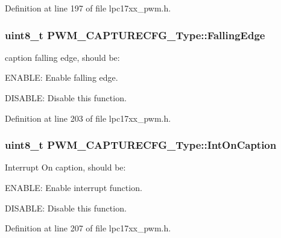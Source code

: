 \-Definition at line 197 of file lpc17xx\-\_\-pwm.\-h.

\hypertarget{struct_p_w_m___c_a_p_t_u_r_e_c_f_g___type_a071675984cbb68eae6d11323188eec27}{
\subsubsection[{\-Falling\-Edge}]{\setlength{\rightskip}{0pt plus 5cm}uint8\-\_\-t {\bf \-P\-W\-M\-\_\-\-C\-A\-P\-T\-U\-R\-E\-C\-F\-G\-\_\-\-Type\-::\-Falling\-Edge}}}\label{struct_p_w_m___c_a_p_t_u_r_e_c_f_g___type_a071675984cbb68eae6d11323188eec27}
caption falling edge, should be\-:
\begin{DoxyItemize}
\item \-E\-N\-A\-B\-L\-E\-: \-Enable falling edge.
\item \-D\-I\-S\-A\-B\-L\-E\-: \-Disable this function. 
\end{DoxyItemize}

\-Definition at line 203 of file lpc17xx\-\_\-pwm.\-h.

\hypertarget{struct_p_w_m___c_a_p_t_u_r_e_c_f_g___type_ab89855a6f6f1a335ab30894982032b08}{
\subsubsection[{\-Int\-On\-Caption}]{\setlength{\rightskip}{0pt plus 5cm}uint8\-\_\-t {\bf \-P\-W\-M\-\_\-\-C\-A\-P\-T\-U\-R\-E\-C\-F\-G\-\_\-\-Type\-::\-Int\-On\-Caption}}}\label{struct_p_w_m___c_a_p_t_u_r_e_c_f_g___type_ab89855a6f6f1a335ab30894982032b08}
\-Interrupt \-On caption, should be\-:
\begin{DoxyItemize}
\item \-E\-N\-A\-B\-L\-E\-: \-Enable interrupt function.
\item \-D\-I\-S\-A\-B\-L\-E\-: \-Disable this function. 
\end{DoxyItemize}

\-Definition at line 207 of file lpc17xx\-\_\-pwm.\-h.

